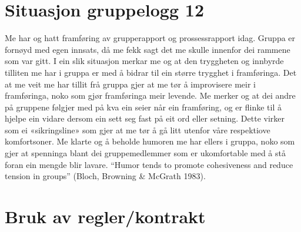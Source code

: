 \section{Situasjon gruppelogg 12}
Me har og hatt framføring av grupperapport og prossessrapport idag. Gruppa er fornøyd med egen innsats, då me fekk sagt det me skulle innenfor dei rammene som var gitt. I ein slik situasjon merkar me og at den tryggheten og innbyrde tilliten me har i gruppa er med å bidrar til ein større trygghet i framføringa. Det at me veit me har tillit frå gruppa gjer at me tør å improvisere meir i framføringa, noko som gjør framføringa meir levende. Me merker og at dei andre på gruppene følgjer med på kva ein seier når ein framføring, og er flinke til å hjelpe ein vidare dersom ein sett seg fast på eit ord eller setning. Dette virker som ei «sikringsline» som gjer at me tør å gå litt utenfor våre respektiove komfortsoner.  Me klarte og å beholde humoren me har ellers i gruppa, noko som gjer at spenninga blant dei gruppemedlemmer som er ukomfortable med å stå foran ein mengde blir lavare. ``Humor tends to promote cohesiveness and reduce tension in groups'' (Bloch, Browning \& McGrath 1983).

\section{Bruk av regler/kontrakt}

